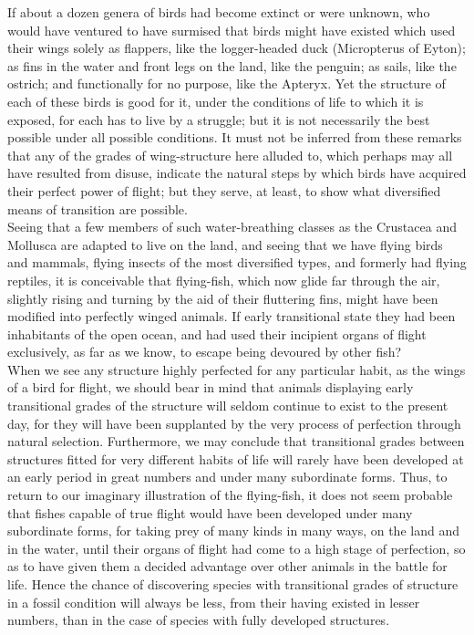 \indent If about a dozen genera of birds had become extinct or were unknown, who would have ventured to have surmised that birds might have existed which used their wings solely as flappers, like the logger-headed duck (Micropterus of Eyton); as fins in the water and front legs on the land, like the penguin; as sails, like the ostrich; and functionally for no purpose, like the Apteryx. Yet the structure of each of these birds is good for it, under the conditions of life to which it is exposed, for each has to live by a struggle; but it is not necessarily the best possible under all possible conditions. It must not be inferred from these remarks that any of the grades of wing-structure here alluded to, which perhaps may all have resulted from disuse, indicate the natural steps by which birds have acquired their perfect power of flight; but they serve, at least, to show what diversified means of transition are possible.\\
\indent Seeing that a few members of such water-breathing classes as the Crustacea and Mollusca are adapted to live on the land, and seeing that we have flying birds and mammals, flying insects of the most diversified types, and formerly had flying reptiles, it is conceivable that flying-fish, which now glide far through the air, slightly rising and turning by the aid of their fluttering fins, might have been modified into perfectly winged animals. If early transitional state they had been inhabitants of the open ocean, and had used their incipient organs of flight exclusively, as far as we know, to escape being devoured by other fish?\\
\indent When we see any structure highly perfected for any particular habit, as the wings of a bird for flight, we should bear in mind that animals displaying early transitional grades of the structure will seldom continue to exist to the present day, for they will have been supplanted by the very process of perfection through natural selection. Furthermore, we may conclude that transitional grades between structures fitted for very different habits of life will rarely have been developed at an early period in great numbers and under many subordinate forms. Thus, to return to our imaginary illustration of the flying-fish, it does not seem probable that fishes capable of true flight would have been developed under many subordinate forms, for taking prey of many kinds in many ways, on the land and in the water, until their organs of flight had come to a high stage of perfection, so as to have given them a decided advantage over other animals in the battle for life. Hence the chance of discovering species with transitional grades of structure in a fossil condition will always be less, from their having existed in lesser numbers, than in the case of species with fully developed structures.\\
